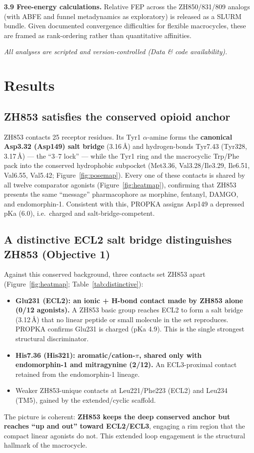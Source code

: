 \documentclass[11pt]{article}
\newcommand{\Ang}{\AA}
\newcommand{\al}{$\alpha$}
\newcommand{\pistack}{$\pi$}
\begin{document}
\textbf{3.9 Free-energy calculations.} Relative FEP across the ZH850/831/809 analogs (with ABFE and
funnel metadynamics as exploratory) is released as a SLURM bundle. Given documented convergence
difficulties for flexible macrocycles, these are framed as rank-ordering rather than quantitative
affinities.

\emph{All analyses are scripted and version-controlled (Data \& code availability).}

\section{Results}

\subsection{ZH853 satisfies the conserved opioid anchor}

ZH853 contacts 25 receptor residues. Its Tyr1 \al-amine forms the \textbf{canonical Asp3.32 (Asp149)
salt bridge} (3.16\,\Ang) and hydrogen-bonds Tyr7.43 (Tyr328, 3.17\,\Ang) --- the ``3--7 lock'' ---
while the Tyr1 ring and the macrocyclic Trp/Phe pack into the conserved hydrophobic subpocket (Met3.36,
Val3.28/Ile3.29, Ile6.51, Val6.55, Val5.42; Figure~\ref{fig:posemap}). Every one of these contacts is
shared by all twelve comparator agonists (Figure~\ref{fig:heatmap}), confirming that ZH853 presents the
same ``message''
pharmacophore as morphine, fentanyl, DAMGO, and endomorphin-1. Consistent with this, PROPKA assigns
Asp149 a depressed pKa (6.0), i.e.\ charged and salt-bridge-competent.

\subsection{A distinctive ECL2 salt bridge distinguishes ZH853 (Objective 1)}

Against this conserved background, three contacts set ZH853 apart (Figure~\ref{fig:heatmap};
Table~\ref{tab:distinctive}):
\begin{itemize}
  \item \textbf{Glu231 (ECL2): an ionic + H-bond contact made by ZH853 alone (0/12 agonists).} A ZH853
  basic group reaches ECL2 to form a salt bridge (3.12\,\Ang) that no linear peptide or small molecule
  in the set reproduces. PROPKA confirms Glu231 is charged (pKa 4.9). This is the single strongest
  structural discriminator.
  \item \textbf{His7.36 (His321): aromatic/cation-\pistack, shared only with endomorphin-1 and
  mitragynine (2/12).} An ECL3-proximal contact retained from the endomorphin-1 lineage.
  \item Weaker ZH853-unique contacts at Leu221/Phe223 (ECL2) and Leu234 (TM5), gained by the
  extended/cyclic scaffold.
\end{itemize}
The picture is coherent: \textbf{ZH853 keeps the deep conserved anchor but reaches ``up and out''
toward ECL2/ECL3}, engaging a rim region that the compact linear agonists do not. This extended loop
engagement is the structural hallmark of the macrocycle.
\end{document}
